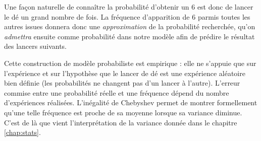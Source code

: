 Une façon naturelle de connaître la probabilité d'obtenir un $6$ est donc de lancer le dé un grand nombre de fois.
La fréquence d'apparition de $6$ parmis toutes les autres issues donnera donc une \emph{approximation} de la probabilité recherchée, qu'on \emph{admettra} ensuite comme probabilité dans notre modèle afin de prédire le résultat des lancers suivants.

Cette construction de modèle probabiliste est empirique : elle ne s'appuie que sur l'expérience et sur l'hypothèse que le lancer de dé est une expérience aléatoire bien définie (les probabilités ne changent pas d'un lancer à l'autre).
L'erreur commise entre une probabilité réelle et une fréquence dépend du nombre d'expériences réalisées.
L'inégalité de Chebyshev permet de montrer formellement qu'une telle fréquence est proche de sa moyenne lorsque sa variance diminue.
C'est de là que vient l'interprétation de la variance donnée dans le chapitre \ref{chap:stats}.




